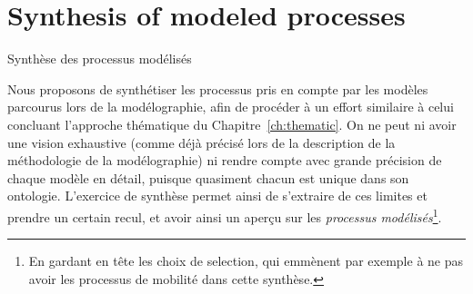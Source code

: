 


\newpage

\section*{Synthesis of modeled processes}{Synthèse des processus modélisés}



Nous proposons de synthétiser les processus pris en compte par les modèles parcourus lors de la modélographie, afin de procéder à un effort similaire à celui concluant l'approche thématique du Chapitre~\ref{ch:thematic}. On ne peut ni avoir une vision exhaustive (comme déjà précisé lors de la description de la méthodologie de la modélographie) ni rendre compte avec grande précision de chaque modèle en détail, puisque quasiment chacun est unique dans son ontologie. L'exercice de synthèse permet ainsi de s'extraire de ces limites et prendre un certain recul, et avoir ainsi un aperçu sur les \emph{processus modélisés}\footnote{En gardant en tête les choix de selection, qui emmènent par exemple à ne pas avoir les processus de mobilité dans cette synthèse.}.



